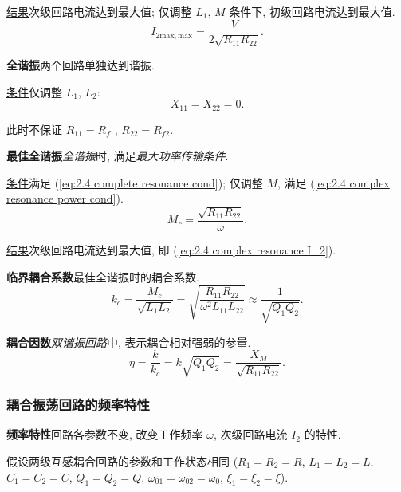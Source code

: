 \underline{结果}\quad 次级回路电流达到最大值; 仅调整 $L_1$, $M$ 条件下, 初级回路电流达到最大值.
\begin{equation} \label{eq:2.4 complex resonance I_2}
    I_{2\mathrm{max,max}}=\frac{V}{2\sqrt{R_{11}R_{22}}}.
\end{equation}

\textbf{全谐振}\quad 两个回路单独达到谐振. \label{2.4 complete resonance}

\underline{条件}\quad 仅调整 $L_1$, $L_2$:
\begin{equation} \label{eq:2.4 complete resonance cond}
    X_{11}=X_{22}=0.
\end{equation}

此时不保证 $R_{11}=R_{f1}$, $R_{22}=R_{f2}$.

\textbf{最佳全谐振}\quad \textit{全谐振}时, 满足\textit{最大功率传输条件}. \label{2.4 best complete resonance}

\underline{条件}\quad 满足 (\ref{eq:2.4 complete resonance cond}); 仅调整 $M$, 满足 (\ref{eq:2.4 complex resonance power cond}).
\begin{equation} \label{eq:2.4 M_c}
    M_c=\frac{\sqrt{R_{11}R_{22}}}{\omega}.
\end{equation}

\underline{结果}\quad 次级回路电流达到最大值, 即 (\ref{eq:2.4 complex resonance I_2}).

\textbf{临界耦合系数}\quad 最佳全谐振时的耦合系数.
\begin{equation}
    k_c=\frac{M_c}{\sqrt{L_1L_2}}=\sqrt{\dfrac{R_{11}R_{22}}{\omega^2L_{11}L_{22}}}\approx\frac{1}{\sqrt{Q_1Q_2}}.
\end{equation}

\textbf{耦合因数}\quad \textit{双谐振回路}中, 表示耦合相对强弱的参量.
\begin{equation} \label{eq:2.4 eta}
    \eta=\frac{k}{k_c}=k\sqrt{Q_1Q_2}=\frac{X_M}{\sqrt{R_{11}R_{22}}}.
\end{equation}

\subsubsection{耦合振荡回路的频率特性}

\textbf{频率特性}\quad 回路各参数不变, 改变工作频率 $\omega$, 次级回路电流 $I_2$ 的特性.

假设两级互感耦合回路的参数和工作状态相同 ($R_1=R_2=R$, $L_1=L_2=L$, $C_1=C_2=C$, $Q_1=Q_2=Q$, $\omega_{01}=\omega_{02}=\omega_0$, $\xi_1=\xi_2=\xi$).

